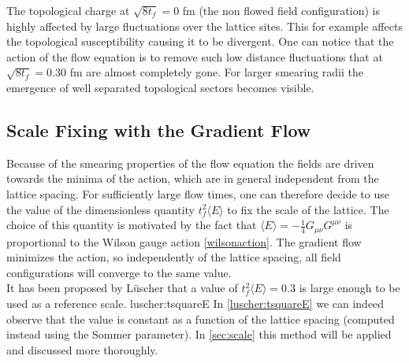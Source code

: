 The topological charge at $\sqrt{8t_f} = 0$ fm (the non flowed field configuration) is highly affected by large fluctuations over the lattice sites. This for example affects the topological susceptibility causing it to be divergent. One can notice that the action of the flow equation is to remove such low distance fluctuations that at $\sqrt{8t_f} = 0.30$ fm are almost completely gone. For larger smearing radii the emergence of well separated topological sectors becomes visible.

\subsection{Scale Fixing with the Gradient Flow}
\label{sec:scale_fixing}
Because of the smearing properties of the flow equation the fields are driven towards the minima of the action, which are in general independent from the lattice spacing. For sufficiently large flow times, one can therefore decide to use the value of the dimensionless quantity $t_f^2\langle E\rangle$ to fix the scale of the lattice. The choice of this quantity is motivated by the fact that $\langle E\rangle = -\frac{1}{4}G_{\mu\nu}G^{\mu\nu}$ is proportional to the Wilson gauge action \cref{wilsonaction}. The gradient flow minimizes the action, so independently of the lattice spacing, all field configurations will converge to the same value.\\
It has been proposed by L{\"u}scher that a value of $t_f^2\langle E\rangle = 0.3$ is large enough to be used as a reference scale. 
 {luscher:tsquareE}
In \cref{luscher:tsquareE} we can indeed observe that the value is constant as a function of the lattice spacing (computed instead using the Sommer parameter). In \cref{sec:scale} this method will be applied and discussed more thoroughly.
 

